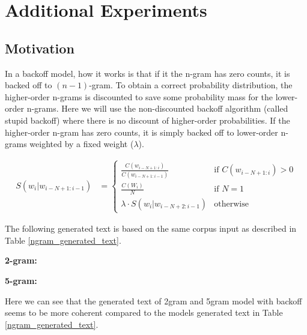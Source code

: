 \section{Additional Experiments}\label{sec:backoff}

\subsection{Motivation \cite{n-gram:ch3}}
In a backoff model, how it works is that if it the n-gram has zero counts, it is backed off to $(n-1)$-gram.
To obtain a correct probability distribution, the higher-order n-grams is discounted to save some probability mass for the lower-order n-grams. 
Here we will use the non-discounted backoff algorithm (called stupid backoff) where there is no discount of higher-order probabilities.
If the higher-order n-gram has zero counts, it is simply backed off to lower-order n-grams weighted by a fixed weight ($\lambda$).

\begin{align}
    S(w_i | w_{i-N+1:i-1}) &= \begin{cases}
        \frac{C(w_{i-N+1:i})}{C(w_{i-N+1:i-1})} & \text{if } C(w_{i-N+1:i}) > 0\\
        \frac{C(W_i)}{N} & \text{if } N = 1\\
        \lambda \cdot S(w_i | w_{i-N+2:i-1}) & \text{otherwise}
    \end{cases}
\end{align}

The following generated text is based on the same corpus input as described in Table \ref{ngram_generated_text}.

\textbf{2-gram:} 
\texttt{}

\textbf{5-gram:} 
\texttt{}

Here we can see that the generated text of 2gram and 5gram model with backoff seems to be more coherent compared to the models generated text in Table \ref{ngram_generated_text}.